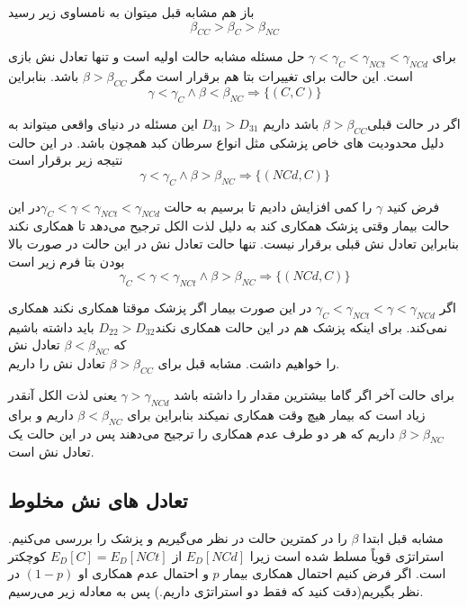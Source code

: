 \documentclass[12pt]{article}
\begin{document}
{{{{{{{{باز هم مشابه قبل میتوان به نامساوی زیر رسید
\[
\beta_{CC} > \beta_{C} > \beta_{NC}
\]

برای $\gamma < \gamma_{C} < \gamma_{NCt} < \gamma_{NCd} $ حل مسئله مشابه حالت اولیه است و  تنها تعادل نش بازی است.
این حالت برای تغییرات بتا هم برقرار است مگر $ \beta > \beta_{CC} $ باشد. بنابراین
\[
\gamma < \gamma_{C} \wedge \beta < \beta_{NC} \Rightarrow \{(C,C)\}
\]

اگر در حالت قبلی$ \beta > \beta_{CC}$ باشد داریم $D_{31} > D_{31} $ این مسئله در دنیای واقعی میتواند به دلیل محدودیت های خاص پزشکی مثل انواع سرطان کبد همچون  باشد. در این حالت نتیجه زیر برقرار است
\[
\gamma < \gamma_{C} \wedge \beta > \beta_{NC} \Rightarrow \{(NCd,C)\}
\]

فرض کنید $\gamma$ را کمی افزایش دادیم تا برسیم به حالت $\gamma_{C} < \gamma < \gamma_{NCt}  < \gamma_{NCd}   $در این حالت بیمار وقتی پزشک همکاری کند به دلیل لذت الکل ترجیح می‌دهد تا همکاری نکند بنابراین تعادل نش قبلی  برقرار نیست. تنها حالت تعادل نش در این حالت در صورت بالا بودن بتا فرم زیر است
\[
\gamma_{C}  < \gamma < \gamma_{NCt} \wedge \beta > \beta_{NC} \Rightarrow \{(NCd,C)\}
\]

اگر $ \gamma_{C} < \gamma_{NCt} < \gamma < \gamma_{NCd} $ در این صورت بیمار اگر پزشک موقتا همکاری نکند همکاری نمی‌کند.
برای اینکه پزشک هم در این حالت همکاری نکند$ D_{22} > D_{32} $ باید داشته باشیم که $ \beta < \beta_{NC} $ تعادل نش\\  را خواهیم داشت.
مشابه قبل برای $\beta > \beta_{CC} $  تعادل نش  را داریم.

برای حالت آخر اگر گاما بیشترین مقدار را داشته باشد $ \gamma > \gamma_{NCd} $ یعنی لذت الکل آنقدر زیاد است که بیمار هیچ وقت همکاری نمیکند بنابراین برای $ \beta < \beta_{NC} $  داریم   و برای $ \beta > \beta_{NC} $  داریم که هر دو طرف عدم همکاری را ترجیح می‌دهند پس  در این حالت یک تعادل نش است.

\subsection{تعادل های نش مخلوط}

مشابه قبل ابتدا $ \beta $ را در کمترین حالت در نظر می‌گیریم و پزشک را بررسی می‌کنیم.
استراتژی  قویاً مسلط شده است زیرا $E_D[NCd] $ از $ E_D[C] = E_D[NCt] $ کوچکتر است.
اگر فرض کنیم احتمال همکاری بیمار $p$ و احتمال عدم همکاری او $ (1-p) $ در نظر بگیریم(دقت کنید که فقط دو استراتژی داریم.) پس به معادله زیر می‌رسیم.

}}}}}}}}
\end{document}
